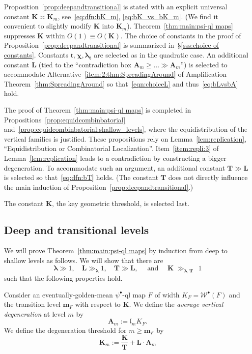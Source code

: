 \documentclass{amsart}
\newcommand{\1}{{\mathbb 1 }}
\newcommand{\blambda}{{\boldsymbol\lambda}}
\newcommand{\Width}{{\mathcal W}}
\newcommand{\bA}{{\mathbf{A}}}
\newcommand{\bL}{{\mathbf L}}
\newcommand{\bT}{{\mathbf T}}
\newcommand{\bK}{{\mathbf K}}
\newcommand{\bbm}{{\mathbf m}}
\newcommand{\bbt}{{\mathbf t}}
\newcommand{\length}{{\mathfrak l}}
\theoremstyle{remark}
\numberwithin{equation}{section}
\theoremstyle{definition}
\newcommand{\bchi}{{\boldsymbol{ \chi}}}
\begin{document}
 Proposition~\ref{prop:deepandtransitional} is stated with an explicit universal constant $\bK\asymp \bK_m$, see~\eqref{eq:dfn:bK_m}, \eqref{eq:bK_vs_bK_m}. (We find it convenient to slightly modify $\bK$ into $\bK_m$). Theorem~\ref{thm:main:psi-ql maps} suppresses $\bK$ within $O(1)\equiv O(\bK)$. The choice of constants in the proof of Proposition~\ref{prop:deepandtransitional} is summarized in~\S\ref{sss:choice of constants}. Constants $\bbt,\bchi,\blambda_\bbt$ are selected as in the quadratic case. An additional constant $\bL$ (tied to the ``contradiction box $\bA_m \ge \dots \gg \bA_m$'') is selected to accommodate Alternative~\ref{item:2:thm:SpreadingAround} of Amplification Theorem~\ref{thm:SpreadingAround} so that~\eqref{eqn:choiceL} and thus~\eqref{eq:bLvsbA} hold. 
 



The proof of Theorem~\ref{thm:main:psi-ql maps} is completed in Propositions~\ref{prop:equidcombinbatorial} and~\ref{prop:equidcombinbatorial:shallow_levels}, where the equidistribution of the vertical families is justified. These propositions rely on Lemma~\ref{lem:replication}, ``Equidistribution or Combinatorial Localization''. Item~\ref{item:repli:3} of Lemma~\ref{lem:replication} leads to a contradiction by constructing a bigger degeneration. To accommodate such an argument, an additional constant $\bT\gg \bL$ is selected so that~\eqref{eq:dfn:bT} holds. (The constant $\bT$ does not directly influence the main induction of Proposition~\ref{prop:deepandtransitional}.) 

The constant $\bK$, the key geometric threshold, is selected last.

\subsection{Deep and transitional levels}\label{subsec:deeptransitional}
We will prove Theorem~\ref{thm:main:psi-ql maps} by induction from deep to shallow levels as follows. We will show that there are \[\blambda \gg 1,\quad \bL \gg_{\blambda} 1,\quad \bT \gg \bL,\quad\text{ and }\quad\bK\ \gg_{\blambda, \bT}\ \  1\] such that the following properties hold. 


Consider an eventually-golden-mean $\psi^\bullet$-ql map $F$ of width $K_F= \Width^\bullet(F)$ and the transition level $\bbm_F$ with respect to $\bK$.
We define the {\em average vertical degeneration} at level $m$ by
$$
\bA_m:= \length_m K_F.
$$
We define the degeneration threshold for $m \geq \bbm_F$ by
\begin{equation}
\label{eq:dfn:bK_m}
    \bK_m:= \frac{\bK}{\bT} + \bL \cdot \bA_m
\end{equation}
\end{document}
